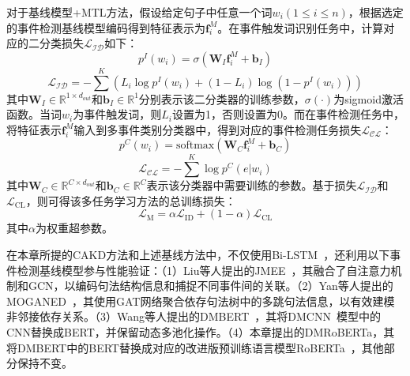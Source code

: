对于基线模型+MTL方法，假设给定句子中任意一个词$w_{i} \left(1 \leq i \leq n\right)$，根据选定的事件检测基线模型编码得到特征表示为$\boldsymbol{f}_i^{M}$。在事件触发词识别任务中，计算对应的二分类损失$\mathcal{L_\textrm{ID}}$如下：
\begin{equation}
  p^{I}\left(w_{i}\right) = \sigma\left(\boldsymbol{W}_{I}\boldsymbol{f}_i^{M} + \boldsymbol{b}_{I}\right)
\end{equation}
\begin{equation}
    \mathcal{L_\textrm{ID}} = - \sum^{K} \left(L_{i} \log p^{I}\left(w_{i}\right) + (1-L_{i}) \log \left(1-p^{I}\left(w_{i}\right)\right) \right)
\end{equation}
其中$\boldsymbol{W}_{I} \in {\mathbb{R}}^{1 \times d_{out}}$和$\boldsymbol{b}_{I} \in {\mathbb{R}}^{1}$分别表示该二分类器的训练参数，$\sigma(\cdot)$为sigmoid激活函数。当词$w_{i}$为事件触发词，则$L_{i}$设置为1，否则设置为0。而在事件检测任务中，将特征表示$\boldsymbol{f}_i^{M}$输入到多事件类别分类器中，得到对应的事件检测任务损失$\mathcal{L_\textrm{CL}}$：
\begin{equation}
  p^{C}\left(w_{i}\right) = \textrm{softmax}\left(\boldsymbol{W}_{C}\boldsymbol{f}_i^{M} + \boldsymbol{b}_{C}\right)
\end{equation}
\begin{equation}
  \mathcal{L_\textrm{CL}} = -\sum^{K} \log p^{C}\left(e|w_{i}\right)
 \label{ce}
\end{equation}
其中$\boldsymbol{W}_{C} \in {\mathbb{R}}^{C \times d_{out}}$和$\boldsymbol{b}_{C} \in {\mathbb{R}}^{C}$表示该分类器中需要训练的参数。基于损失$\mathcal{L_\textrm{ID}}$和$\mathcal{L}_\textrm{CL}$，则可得该多任务学习方法的总训练损失：
\begin{equation}    \mathcal{L}_\textrm{M}=\alpha\mathcal{L}_\textrm{ID}+(1-\alpha)\mathcal{L}_\textrm{CL}
\end{equation}
其中$\alpha$为权重超参数。

在本章所提的CAKD方法和上述基线方法中，不仅使用Bi-LSTM~\cite{hochreiter1997long}，还利用以下事件检测基线模型参与性能验证：（1）Liu等人提出的JMEE~\cite{liu2018jointly}，其融合了自注意力机制和GCN，以编码句法结构信息和捕捉不同事件间的关联。（2）Yan等人提出的MOGANED~\cite{yan2019event}，其使用GAT网络聚合依存句法树中的多跳句法信息，以有效建模非邻接依存关系。（3）Wang等人提出的DMBERT~\cite{wang2019adversarial}，其将DMCNN~\cite{chen2015event}模型中的CNN替换成BERT，并保留动态多池化操作。（4）本章提出的DMRoBERTa，其将DMBERT中的BERT替换成对应的改进版预训练语言模型RoBERTa~\cite{liu2019roberta}，其他部分保持不变。

